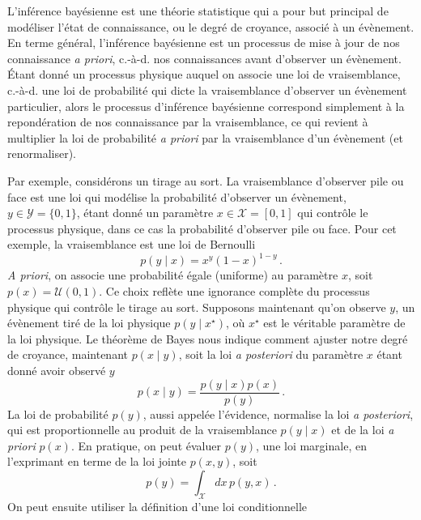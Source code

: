 L'inférence bayésienne est une théorie statistique qui a pour but principal de modéliser l'état de connaissance, 
ou le degré de croyance, associé à un évènement.  En terme général, l'inférence bayésienne est un processus de mise à jour de nos 
connaissance \textit{a priori}, c.-à-d. nos connaissances avant d'observer un évènement. Étant donné un processus physique auquel on associe une loi de 
vraisemblance, c.-à-d. une loi de probabilité qui dicte la vraisemblance d'observer un évènement particulier, alors le processus d'inférence 
bayésienne correspond simplement à la repondération de nos connaissance par la vraisemblance, ce qui revient à multiplier la loi de 
probabilité \textit{a priori} par la vraisemblance d'un évènement (et renormaliser).

Par exemple, considérons un tirage au sort. 
La vraisemblance d'observer pile ou face est une loi qui modélise la probabilité d'observer un évènement, $y \in \mathcal{Y}=\{0, 1\}$, étant 
donné un paramètre $x \in \mathcal{X} = [0, 1]$ qui contrôle le processus physique, dans ce cas la probabilité d'observer pile ou face. 
Pour cet exemple, la vraisemblance est une loi de Bernoulli 
\begin{equation}
        p(y \mid x) = x^{y} (1 - x)^{1 - y}\, .
\end{equation} 
\textit{A priori}, on associe une probabilité égale (uniforme) au paramètre $x$, soit $p(x) = \mathcal{U}(0, 1)$. 
Ce choix reflète une ignorance complète du processus physique qui contrôle le tirage au sort.
Supposons maintenant qu'on observe $y$, un évènement tiré de la loi physique $p(y \mid x^{\star})$, où $x^{\star}$ est le véritable paramètre de la loi physique.
Le théorème de Bayes nous indique comment ajuster notre degré de croyance, maintenant $p(x \mid y)$, soit la loi \textit{a posteriori} du paramètre $x$ étant donné avoir observé $y$
\begin{equation}\label{eq:Bayes1}
        p(x \mid y) = \frac{p(y \mid x) p(x)}{p(y)} \, .
\end{equation} 
La loi de probabilité $p(y)$, aussi appelée l'évidence, normalise la loi \textit{a posteriori}, qui est proportionnelle au produit de la vraisemblance $p(y \mid x)$ et 
de la loi \textit{a priori} $p(x)$. En pratique, on peut évaluer $p(y)$, une loi marginale, en l'exprimant 
en terme de la loi jointe $p(x, y)$, soit 
\begin{equation}
        p(y) = \int_\mathcal{X} dx\, p(y, x) \, .
\end{equation} 
On peut ensuite utiliser la définition d'une loi conditionnelle 
